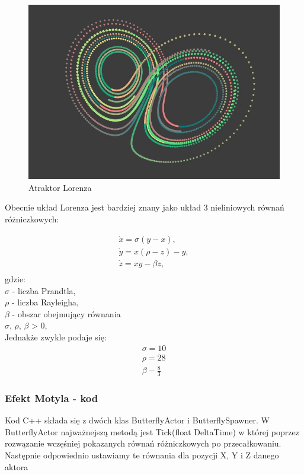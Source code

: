 \documentclass[a4paper,12pt,reqno]{article}
\begin{document}
\begin{figure}[H]%
\centering
\includegraphics[width=0.7\columnwidth]{graphics/butterfly/Lorenz_Attractor.jpg}
\caption{Atraktor Lorenza 
\label{BPExample}}%
%
\qquad
\end{figure} 

Obecnie układ Lorenza jest bardziej znany jako układ 3 nieliniowych
równań różniczkowych\cite{lorenz_dziwne_atraktory}:

\begin{equation}
\begin{split}
\dot{x}=\sigma(y-x),\\
\dot{y}=x(\rho-z)-y,\\
\dot{z}=xy-\beta z,\\
\end{split}
\end{equation}
gdzie:\\
$\sigma$ - liczba Prandtla,\\
$\rho$ - liczba Rayleigha,\\
$\beta$ - obszar obejmujący równania\\
$\sigma$, $\rho$, $\beta$ > 0,\\
Jednakże zwykle podaje się\cite{lorenz_dziwne_atraktory}:\\
\begin{equation}
\begin{split}
\sigma = 10\\
\rho = 28\\
\beta - \frac{8}{3}
\end{split}
\label{ButterflyVariables}
\end{equation}

\subsubsection{Efekt Motyla - kod}

Kod C++ składa się z dwóch klas ButterflyActor i ButterflySpawner.
W ButterflyActor najważnejszą metodą jest Tick(float DeltaTime) w której poprzez rozwązanie wczęśniej pokazanych równań różniczkowych po przecałkowaniu. Następnie odpowiednio ustawiamy te równania dla pozycji X, Y i Z danego aktora \cite{motyle_cpp}
\end{document}

